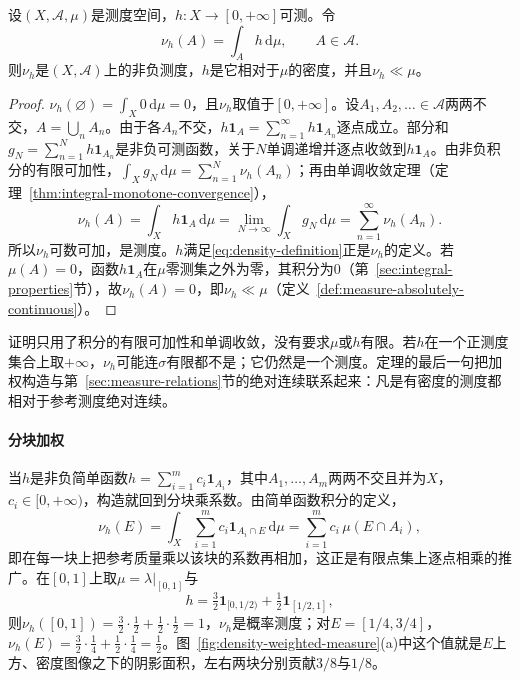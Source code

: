 \begin{theorem}[加权测度]
\label{thm:density-weighted-measure}
设$(X,\mathcal A,\mu)$是测度空间，$h:X\to[0,+\infty]$可测。令
\[
 \nu_h(A)=\int_Ah\,\mathrm d\mu,\qquad A\in\mathcal A .
\]
则$\nu_h$是$(X,\mathcal A)$上的非负测度，$h$是它相对于$\mu$的密度，并且$\nu_h\ll\mu$。
\end{theorem}

\begin{proof}
$\nu_h(\varnothing)=\int_X0\,\mathrm d\mu=0$，且$\nu_h$取值于$[0,+\infty]$。设$A_1,A_2,\dots\in\mathcal A$两两不交，$A=\bigcup_nA_n$。由于各$A_n$不交，$h\mathbf 1_A=\sum_{n=1}^\infty h\mathbf 1_{A_n}$逐点成立。部分和$g_N=\sum_{n=1}^Nh\mathbf 1_{A_n}$是非负可测函数，关于$N$单调递增并逐点收敛到$h\mathbf 1_A$。由非负积分的有限可加性，$\int_Xg_N\,\mathrm d\mu=\sum_{n=1}^N\nu_h(A_n)$；再由单调收敛定理（定理~\ref{thm:integral-monotone-convergence}），
\[
 \nu_h(A)=\int_Xh\mathbf 1_A\,\mathrm d\mu=\lim_{N\to\infty}\int_Xg_N\,\mathrm d\mu=\sum_{n=1}^\infty\nu_h(A_n).
\]
所以$\nu_h$可数可加，是测度。$h$满足\eqref{eq:density-definition}正是$\nu_h$的定义。若$\mu(A)=0$，函数$h\mathbf 1_A$在$\mu$零测集之外为零，其积分为$0$（第~\ref{sec:integral-properties}节），故$\nu_h(A)=0$，即$\nu_h\ll\mu$（定义~\ref{def:measure-absolutely-continuous}）。
\end{proof}

证明只用了积分的有限可加性和单调收敛，没有要求$\mu$或$h$有限。若$h$在一个正测度集合上取$+\infty$，$\nu_h$可能连$\sigma$有限都不是；它仍然是一个测度。定理的最后一句把加权构造与第~\ref{sec:measure-relations}节的绝对连续联系起来：凡是有密度的测度都相对于参考测度绝对连续。

\paragraph{分块加权}
当$h$是非负简单函数$h=\sum_{i=1}^mc_i\mathbf 1_{A_i}$，其中$A_1,\dots,A_m$两两不交且并为$X$，$c_i\in[0,+\infty)$，构造就回到分块乘系数。由简单函数积分的定义，
\[
 \nu_h(E)=\int_X\sum_{i=1}^mc_i\mathbf 1_{A_i\cap E}\,\mathrm d\mu=\sum_{i=1}^mc_i\,\mu(E\cap A_i),
\]
即在每一块上把参考质量乘以该块的系数再相加，这正是有限点集上逐点相乘的推广。在$[0,1]$上取$\mu=\lambda|_{[0,1]}$与
\[
 h=\tfrac32\mathbf 1_{[0,1/2)}+\tfrac12\mathbf 1_{[1/2,1]},
\]
则$\nu_h([0,1])=\tfrac32\cdot\tfrac12+\tfrac12\cdot\tfrac12=1$，$\nu_h$是概率测度；对$E=[1/4,3/4]$，$\nu_h(E)=\tfrac32\cdot\tfrac14+\tfrac12\cdot\tfrac14=\tfrac12$。图~\ref{fig:density-weighted-measure}(a)中这个值就是$E$上方、密度图像之下的阴影面积，左右两块分别贡献$3/8$与$1/8$。


